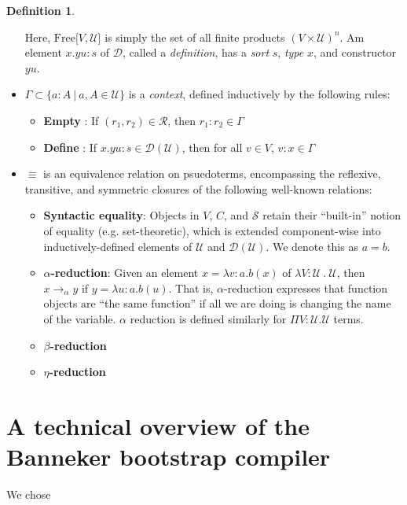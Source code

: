 \documentclass{amsbook}
\DeclareRobustCommand{\#}{\adjustbox{valign=B,totalheight=.57\baselineskip}{\oldhash}}%
\theoremstyle{definition}
\newtheorem{definition}[theorem]{Definition}
\theoremstyle{remark}
\numberwithin{section}{chapter}
\numberwithin{equation}{chapter}
\begin{document}
\begin{definition}
\begin{itemize}
\begin{equation*}
            \end{equation*}
        Here, $\mathrm{Free}\lbrack V , \mathcal{U}\rbrack$ is simply the set of all finite products $(V \times \mathcal{U})^n$.
        Am element $x . y u : s$ of $\mathcal{D}$, called a \emph{definition}, has a \emph{sort} $s$, \emph{type} $x$, and constructor $y u$. 
        \item $\Gamma \subset \{a : A\ |\ a,A \in \mathcal{U}\}$ is a \emph{context}, defined inductively by the following rules:
            \begin{itemize}
                \item \textbf{Empty} : If $(r_1,r_2)\in\mathcal{R}$, then $r_1 : r_2 \in \Gamma$
                \item \textbf{Define} : If $x . y u : s \in \mathcal{D}(\mathcal{U})$, then for all $v \in V$, $v : x \in \Gamma$
            \end{itemize}
        \item $\equiv$ is an equivalence relation on psuedoterms, encompassing the reflexive, transitive, and symmetric closures of the following well-known relations:
            \begin{itemize}
                \item \textbf{Syntactic equality}: Objects in $V$, $C$, and $\mathcal{S}$ retain their ``built-in'' notion of equality (e.g. set-theoretic), which is extended component-wise into inductively-defined elements of $\mathcal{U}$ and $\mathcal{D}(\mathcal{U})$. We denote this as $a = b$.
                \item \textbf{$\alpha$-reduction}: Given an element $x = \lambda v : a . b(x)$ of $\lambda V : \mathcal{U}\ .\ \mathcal{U}$, then $x \rightarrow_{\alpha} y$ if $y = \lambda u : a . b(u)$. That is, $\alpha$-reduction expresses that function objects are ``the same function'' if all we are doing is changing the name of the variable.
                $\alpha$ reduction is defined similarly for  $\Pi V : \mathcal{U} .\mathcal{U}$ terms.
                \item \textbf{$\beta$-reduction}
                \item \textbf{$\eta$-reduction}
            \end{itemize}
    \end{itemize}
\end{definition}

\chapter{A technical overview of the Banneker bootstrap compiler}

We chose 

\appendix
% 

\backmatter


\printindex
\end{document}
